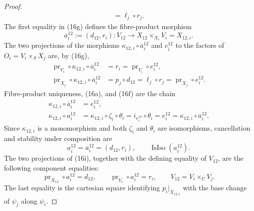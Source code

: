 \begin{proof}
\[\begin{aligned}
       =\ell_j\circ r_j.
  \end{aligned}                                                   \tag{16g}
  \]
  The first equality in (16g) defines the fibre-product morphism
  \[
    \overline a_i^{12}:=(d_{12},r_i)
      \colon V_{12}\longrightarrow
        X_{12}\times_{X_i}V_i=X_{12,i}.                         \tag{16h}
  \]
  The two projections of the morphisms
  $\kappa_{12,i}\circ\overline a_i^{12}$ and $e_i^{12}$ to the factors of
  $O_i=V_i\times_SX_j$ are, by (16g),
  \[
  \begin{aligned}
    \operatorname{pr}_{V_i}\circ\kappa_{12,i}\circ
      \overline a_i^{12}
      &=r_i
       =\operatorname{pr}_{V_i}\circ e_i^{12},\\
    \operatorname{pr}_{X_j}\circ\kappa_{12,i}\circ
      \overline a_i^{12}
      &=p_j\circ d_{12}
       =\ell_j\circ r_j
       =\operatorname{pr}_{X_j}\circ e_i^{12}.
  \end{aligned}
  \]
  Fibre-product uniqueness, (16a), and (16f) are the chain
  \[
  \begin{aligned}
    \kappa_{12,i}\circ\overline a_i^{12}
      &=e_i^{12},\\
    \kappa_{12,i}\circ a_i^{12}
      &=\kappa_{12,i}\circ\zeta_i\circ\theta_i
       =i_{e_i^{12}}\circ\theta_i
       =e_i^{12}
       =\kappa_{12,i}\circ\overline a_i^{12}.
  \end{aligned}
  \]
  Since $\kappa_{12,i}$ is a monomorphism and both $\zeta_i$ and $\theta_i$
  are isomorphisms, cancellation and stability under composition are
  \[
    a_i^{12}=\overline a_i^{12}=(d_{12},r_i),
    \qquad
    \operatorname{IsIso}(a_i^{12}).                             \tag{16i}
  \]
  The two projections of (16i), together with the defining equality of
  $V_{12}$, are the following component equalities:
  \[
    \operatorname{pr}_{X_{12}}\circ a_i^{12}=d_{12},\qquad
    \operatorname{pr}_{V_i}\circ a_i^{12}=r_i,\qquad
    V_{12}=V_i\times_UV_j.
  \]
  The last equality is the cartesian square identifying
  $p_i|_{X_{12,i}}$ with the base change of $\psi_j$ along $\psi_i$.
\end{proof}

